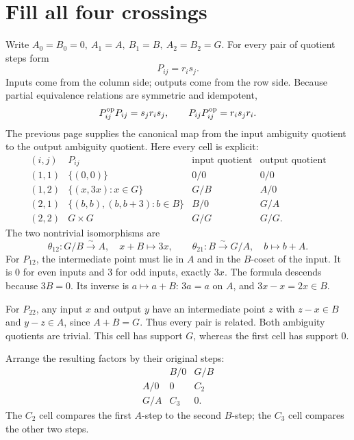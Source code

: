 
\clearpage
\section{Fill all four crossings}\label{c:rectangle}
Write \(A_0=B_0=0,\ A_1=A,\ B_1=B,\ A_2=B_2=G\).
For every pair of quotient steps form
\[
 P_{ij}=r_i s_j.
\]
Inputs come from the column side; outputs come from the row side.
Because partial equivalence relations are symmetric and idempotent,
\[
 P_{ij}^{\mathrm{op}}P_{ij}=s_jr_i s_j,\qquad
 P_{ij}P_{ij}^{\mathrm{op}}=r_i s_jr_i.
\]
The previous page supplies the canonical map from the input ambiguity
quotient to the output ambiguity quotient. Here every cell is explicit:
\[
\begin{array}{c|l|c|c}
 (i,j)&P_{ij}&\text{input quotient}&\text{output quotient}\\ \hline
 (1,1)&\{(0,0)\}&0/0&0/0\\
 (1,2)&\{(x,3x):x\in G\}&G/B&A/0\\
 (2,1)&\{(b,b),(b,b+3):b\in B\}&B/0&G/A\\
 (2,2)&G\times G&G/G&G/G .
\end{array}
\]
The two nontrivial isomorphisms are
\[
 \theta_{12}:G/B\xrightarrow{\sim}A,\quad x+B\longmapsto3x,
 \qquad
 \theta_{21}:B\xrightarrow{\sim}G/A,\quad b\longmapsto b+A.
\]
For \(P_{12}\), the intermediate point must lie in \(A\) and in the
\(B\)-coset of the input. It is \(0\) for even inputs and \(3\) for odd
inputs, exactly \(3x\). The formula descends because \(3B=0\).
Its inverse is \(a\mapsto a+B\): \(3a=a\) on \(A\), and
\(3x-x=2x\in B\).

For \(P_{22}\), any input \(x\) and output \(y\) have an intermediate
point \(z\) with \(z-x\in B\) and \(y-z\in A\), since \(A+B=G\).
Thus every pair is related. Both ambiguity quotients are trivial.
This cell has support \(G\), whereas the first cell has support \(0\).

Arrange the resulting factors by their original steps:
\[
\begin{array}{c|cc}
 &B/0&G/B\\ \hline
 A/0&0&C_2\\
 G/A&C_3&0 .
\end{array}
\]
The \(C_2\) cell compares the first \(A\)-step to the second \(B\)-step;
the \(C_3\) cell compares the other two steps.


